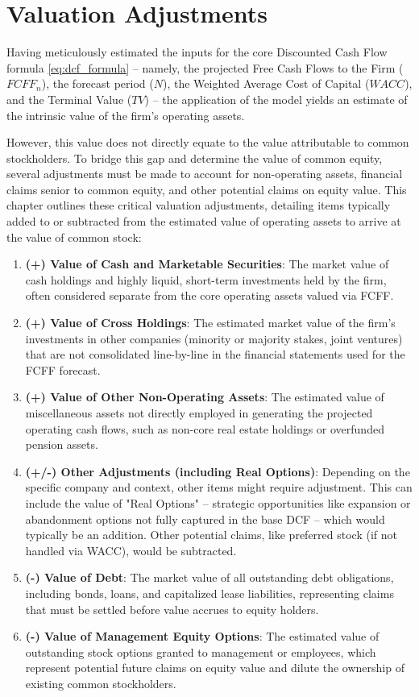 \chapter{Valuation Adjustments} \label{chap:valuation_adjustments}

Having meticulously estimated the inputs for the core Discounted Cash Flow formula \eqref{eq:dcf_formula} – namely, the projected Free Cash Flows to the Firm (\(FCFF_n\)), the forecast period (\(N\)), the Weighted Average Cost of Capital (\(WACC\)), and the Terminal Value (\(TV\)) – the application of the model yields an estimate of the intrinsic value of the firm's operating assets.

However, this value does not directly equate to the value attributable to common stockholders. To bridge this gap and determine the value of common equity, several adjustments must be made to account for non-operating assets, financial claims senior to common equity, and other potential claims on equity value. This chapter outlines these critical valuation adjustments, detailing items typically added to or subtracted from the estimated value of operating assets to arrive at the value of common stock:

\begin{enumerate}
    \item \textbf{(+) Value of Cash and Marketable Securities}: The market value of cash holdings and highly liquid, short-term investments held by the firm, often considered separate from the core operating assets valued via FCFF.
    \item \textbf{(+) Value of Cross Holdings}: The estimated market value of the firm's investments in other companies (minority or majority stakes, joint ventures) that are not consolidated line-by-line in the financial statements used for the FCFF forecast.
    \item \textbf{(+) Value of Other Non-Operating Assets}: The estimated value of miscellaneous assets not directly employed in generating the projected operating cash flows, such as non-core real estate holdings or overfunded pension assets.
    \item \textbf{(+/-) Other Adjustments (including Real Options)}: Depending on the specific company and context, other items might require adjustment. This can include the value of "Real Options" – strategic opportunities like expansion or abandonment options not fully captured in the base DCF – which would typically be an addition. Other potential claims, like preferred stock (if not handled via WACC), would be subtracted.
    \item \textbf{(-) Value of Debt}: The market value of all outstanding debt obligations, including bonds, loans, and capitalized lease liabilities, representing claims that must be settled before value accrues to equity holders.
    \item \textbf{(-) Value of Management Equity Options}: The estimated value of outstanding stock options granted to management or employees, which represent potential future claims on equity value and dilute the ownership of existing common stockholders.
\end{enumerate}

